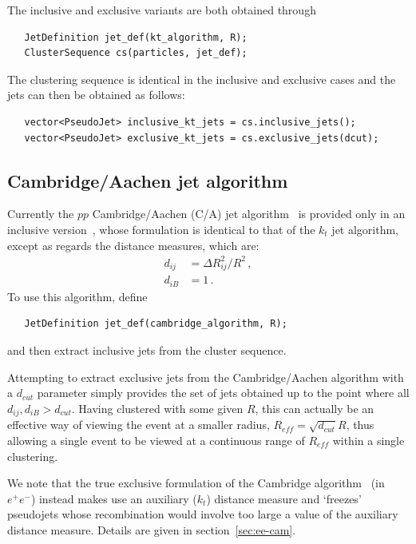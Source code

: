 \documentclass[12pt,a4]{article}
\begin{document}
The inclusive and exclusive variants are both obtained through 
\begin{lstlisting}
   JetDefinition jet_def(kt_algorithm, R);
   ClusterSequence cs(particles, jet_def);
\end{lstlisting}
The clustering sequence is identical in the inclusive and exclusive
cases and the jets can then be obtained as follows:
\begin{lstlisting}
   vector<PseudoJet> inclusive_kt_jets = cs.inclusive_jets();
   vector<PseudoJet> exclusive_kt_jets = cs.exclusive_jets(dcut);
\end{lstlisting}

\subsection{Cambridge/Aachen jet algorithm}

Currently the $pp$ Cambridge/Aachen (C/A) jet
algorithm~\cite{CamOrig,CamWobisch} is provided only in an inclusive
version~\cite{CamWobisch}, whose formulation is identical to that of
the $k_t$ jet algorithm, except as regards the distance measures,
which are:
\begin{subequations}
  \label{eq:dij_cam}
  \begin{align}
    d_{ij} &= \Delta R_{ij}^2 / R^2\,,\\
    d_{iB} &= 1\,.
  \end{align}
\end{subequations}
To use this algorithm, define 
\begin{lstlisting}
   JetDefinition jet_def(cambridge_algorithm, R);
\end{lstlisting}
and then extract inclusive jets from the cluster sequence.

Attempting to extract exclusive jets from the Cambridge/Aachen
algorithm with a
$d_{cut}$ parameter simply provides the set of jets obtained up to the
point where all $d_{ij},d_{iB} > d_{cut}$. Having clustered with some
given $R$, this can actually be an effective way of viewing the event
at a smaller radius, $R_{eff} = \sqrt{d_{cut}} R$, thus allowing a
single event to be viewed at a continuous range of $R_{eff}$ within a
single clustering.

We note that the true exclusive formulation of the Cambridge
algorithm~\cite{CamOrig} (in $e^+e^-$) instead makes use an auxiliary ($k_t$)
distance measure and `freezes' pseudojets whose recombination would
involve too large a value of the auxiliary distance measure. Details
are given in section~\ref{sec:ee-cam}.
\end{document}

